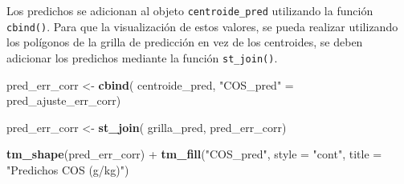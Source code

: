 \documentclass[11pt,b5paper,]{krantz}
\newenvironment{Shaded}{}{}
\newcommand{\DataTypeTok}[1]{\textcolor[rgb]{0.56,0.13,0.00}{#1}}
\newcommand{\KeywordTok}[1]{\textcolor[rgb]{0.00,0.44,0.13}{\textbf{#1}}}
\newcommand{\NormalTok}[1]{#1}
\newcommand{\OperatorTok}[1]{\textcolor[rgb]{0.40,0.40,0.40}{#1}}
\newcommand{\StringTok}[1]{\textcolor[rgb]{0.25,0.44,0.63}{#1}}
\begin{document}
Los predichos se adicionan al objeto \texttt{centroide\_pred} utilizando la función \texttt{cbind()}. Para que la visualización de estos valores, se pueda realizar utilizando los polígonos de la grilla de predicción en vez de los centroides, se deben adicionar los predichos mediante la función \texttt{st\_join()}.

\begin{Shaded}
\begin{Highlighting}[]
\NormalTok{pred_err_corr <-}\StringTok{ }\KeywordTok{cbind}\NormalTok{(}
\NormalTok{  centroide_pred,}
  \StringTok{"COS_pred"}\NormalTok{ =}\StringTok{ }\NormalTok{pred_ajuste_err_corr)}

\NormalTok{pred_err_corr <-}\StringTok{ }\KeywordTok{st_join}\NormalTok{(}
\NormalTok{  grilla_pred,}
\NormalTok{  pred_err_corr)}

\KeywordTok{tm_shape}\NormalTok{(pred_err_corr) }\OperatorTok{+}
\StringTok{  }\KeywordTok{tm_fill}\NormalTok{(}\StringTok{"COS_pred"}\NormalTok{, }\DataTypeTok{style =} \StringTok{"cont"}\NormalTok{,}
          \DataTypeTok{title =} \StringTok{"Predichos COS (g/kg)"}\NormalTok{)}
\end{Highlighting}
\end{Shaded}
\end{document}
